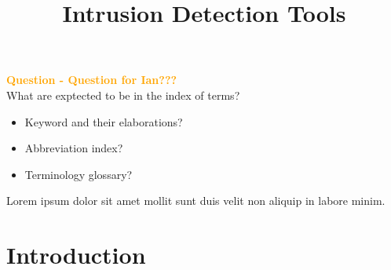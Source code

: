 \documentclass[conference]{IEEEtran}
\newenvironment{question}[1][\unskip]{%
\par
\noindent
\textcolor{orange}{\bfseries{Question - } #1???}
\\ \color{orange}}
{}
\begin{document}
\title{Intrusion Detection Tools\\}

\author{
}


\maketitle




\begin{IEEEkeywords}

  \begin{question}[Question for Ian]
  What are exptected to be in the index of terms?

    \begin{itemize}
      \item Keyword and their elaborations?
      \item Abbreviation index?
      \item Terminology glossary?
    \end{itemize}

  \end{question}


Lorem ipsum dolor sit amet mollit sunt duis velit non aliquip in labore minim.


\end{IEEEkeywords}

\section{Introduction}

\end{document}
